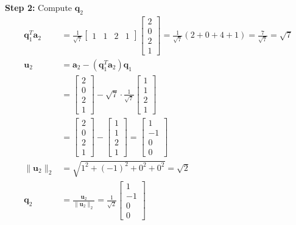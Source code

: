 \textbf{Step 2:} Compute $\mathbf{q}_2$
\begin{align*}
    \mathbf{q}_1^T \mathbf{a}_2 & = \frac{1}{\sqrt{7}} \begin{bmatrix} 1 & 1 & 2 & 1 \end{bmatrix} \begin{bmatrix} 2 \\ 0 \\ 2 \\ 1 \end{bmatrix} = \frac{1}{\sqrt{7}}(2 + 0 + 4 + 1) = \frac{7}{\sqrt{7}} = \sqrt{7} \\
    \mathbf{u}_2                & = \mathbf{a}_2 - (\mathbf{q}_1^T \mathbf{a}_2)\mathbf{q}_1                                                                                                                          \\
                                & = \begin{bmatrix} 2 \\ 0 \\ 2 \\ 1 \end{bmatrix} - \sqrt{7} \cdot \frac{1}{\sqrt{7}} \begin{bmatrix} 1 \\ 1 \\ 2 \\ 1 \end{bmatrix}                                                 \\
                                & = \begin{bmatrix} 2 \\ 0 \\ 2 \\ 1 \end{bmatrix} - \begin{bmatrix} 1 \\ 1 \\ 2 \\ 1 \end{bmatrix} = \begin{bmatrix} 1 \\ -1 \\ 0 \\ 0 \end{bmatrix}                                 \\
    \|\mathbf{u}_2\|_2          & = \sqrt{1^2 + (-1)^2 + 0^2 + 0^2} = \sqrt{2}                                                                                                                                        \\
    \mathbf{q}_2                & = \frac{\mathbf{u}_2}{\|\mathbf{u}_2\|_2} = \frac{1}{\sqrt{2}} \begin{bmatrix} 1 \\ -1 \\ 0 \\ 0 \end{bmatrix}
\end{align*}

